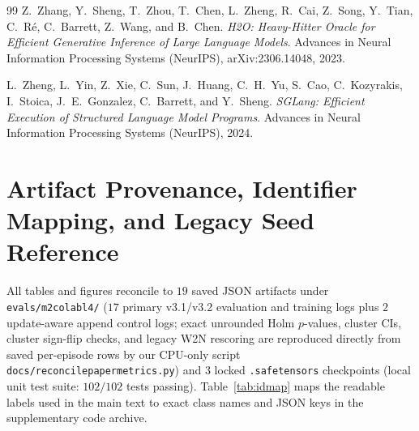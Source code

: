 \documentclass[11pt]{article}
\renewcommand{\_}{\origunderscore\allowbreak}
\begin{document}
\begin{thebibliography}{99}
Z.~Zhang, Y.~Sheng, T.~Zhou, T.~Chen, L.~Zheng, R.~Cai, Z.~Song, Y.~Tian, C.~R{\'e}, C.~Barrett, Z.~Wang, and B.~Chen.
\newblock \textit{H2O: Heavy-Hitter Oracle for Efficient Generative Inference of Large Language Models}.
\newblock Advances in Neural Information Processing Systems (NeurIPS), arXiv:2306.14048, 2023.

L.~Zheng, L.~Yin, Z.~Xie, C.~Sun, J.~Huang, C.~H.~Yu, S.~Cao, C.~Kozyrakis, I.~Stoica, J.~E.~Gonzalez, C.~Barrett, and Y.~Sheng.
\newblock \textit{SGLang: Efficient Execution of Structured Language Model Programs}.
\newblock Advances in Neural Information Processing Systems (NeurIPS), 2024.

\end{thebibliography}

\appendix
\section{Artifact Provenance, Identifier Mapping, and Legacy Seed Reference}
\label{app:legacy}

All tables and figures reconcile to $19$ saved JSON artifacts under \texttt{evals/m2\_colab\_l4/} ($17$ primary v3.1/v3.2 evaluation and training logs plus $2$ update-aware append control logs; exact unrounded Holm $p$-values, cluster CIs, cluster sign-flip checks, and legacy W2N rescoring are reproduced directly from saved per-episode rows by our CPU-only script \texttt{docs/reconcile\_paper\_metrics.py}) and $3$ locked \texttt{.safetensors} checkpoints (local unit test suite: $102/102$ tests passing). Table~\ref{tab:idmap} maps the readable labels used in the main text to exact class names and JSON keys in the supplementary code archive.
\end{document}
